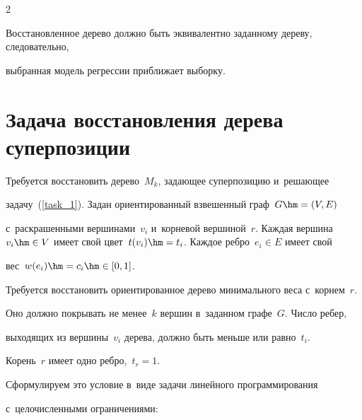\begin{multicols}{2}
\noindent

Восстановленное дерево должно быть эквивалентно заданному дереву, следовательно, 

выбранная модель регрессии при\-бли\-жа\-ет выборку.



\vspace*{-12pt}



\section{Задача восстановления дерева суперпозиции}



\vspace*{-3pt}



Требуется восстановить дерево~$M_k$, задающее  суперпозицию и~решающее 

задачу~(\ref{task_1}). Задан ориентированный взвешенный граф~$G\hm=(V,E)$ 

с~раскрашенными вершинами~$v_i$ и~корневой вершиной~$r$. Каждая вершина~$v_i \hm\in 

V$ имеет свой цвет~$t(v_i)\hm=t_i$. Каждое реб\-ро~$e_i\in E$ имеет свой 

вес~\mbox{$w(e_i)\hm=c_i\hm\in[0,1]$}.



Требуется восстановить ориентированное дерево минимального веса с~корнем~$r$. 

Оно должно покрывать не менее~$k$ вершин в~заданном графе~$G$. Чис\-ло ребер, 

выходящих из вершины~$v_i$ дерева, должно быть меньше или равно~$t_i$. 

Корень~$r$ имеет одно ребро,~$t_r=1$.



Сформулируем это условие в~виде задачи линейного программирования 

с~целочисленными ограничениями:



\vspace*{2pt}



\noindent

\begin{equation}

\left.

\begin{array}{rll}


\end{array}
\end{equation}
\end{multicols}
